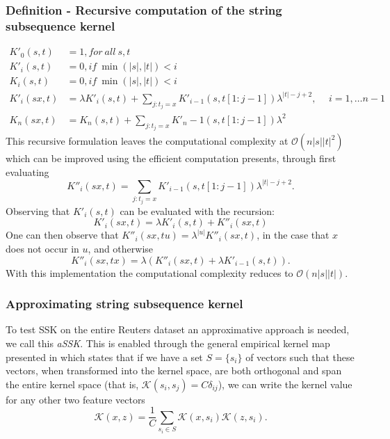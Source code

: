 \subsubsection{Definition - Recursive computation of the string subsequence kernel}
\begin{align*}
	K'_{0}(s,t) & = 1, for\ all\ s,t \\
	K'_i(s,t) & = 0, if\ \min(|s|,|t|) < i \\
	K_i(s,t) & = 0, if\ \min(|s|,|t|) < i \\
	K'_i(sx,t) & = \lambda K'_i(s,t) + \sum_{j:t_j=x} K'_{i-1}(s,t[1:j-1])\lambda^{|t|-j+2}, \hspace{15pt} i = 1, \dots n-1 \\	
	K_{n}(sx,t) & = K_n(s,t) + \sum_{j:t_j = x}K'_n-1(s,t[1:j-1])\lambda^2
\end{align*}  
This recursive formulation leaves the computational complexity at $ \mathcal{O}(n|s||t|^2) $ which can be improved using the efficient computation \cite{lodhi} presents, through first evaluating
\begin{equation*}\label{key}
K''_i(sx,t) = \sum_{j:t_j = x}K'_{i-1}(s,t[1:j-1])\lambda^{|t|-j+2}.
\end{equation*}
Observing that $ K'_i(s,t) $ can be evaluated with the recursion:
\begin{equation*}\label{key}
K'_i(sx,t) = \lambda K'_i(s,t) + K''_i(sx,t)
\end{equation*}
One can then observe that $ K''_i(sx,tu) = \lambda^{|u|}K''_i(sx,t)$, in the case that $ x $ does not occur in $ u $, and otherwise 
\begin{equation*}\label{key}
K''_i(sx,tx) = \lambda \left( K''_i(sx,t) + \lambda K'_{i-1}(s,t) \right).
\end{equation*} 
With this implementation the computational complexity reduces to $ \mathcal{O}(n|s||t|) $.



\subsubsection{Approximating string subsequence kernel}
To test SSK on the entire Reuters dataset an approximative approach is needed, we call this \textit{aSSK}. This is enabled through the general empirical kernel map presented in \cite{Scholkopf} which states that if we have a set $ S = \{s_i\} $ of vectors such that these vectors, when transformed into the kernel space, are both orthogonal and span the entire kernel space (that is, $ \mathcal{K}(s_i,s_j) = C\delta_{ij} $), we can write the kernel value for any other two feature vectors
\begin{equation}\label{eq:kernel_approx}
\mathcal{K}(x,z) = \dfrac{1}{C}\sum_{s_i \in S}\mathcal{K}(x,s_i)\mathcal{K}(z,s_i).
\end{equation}

